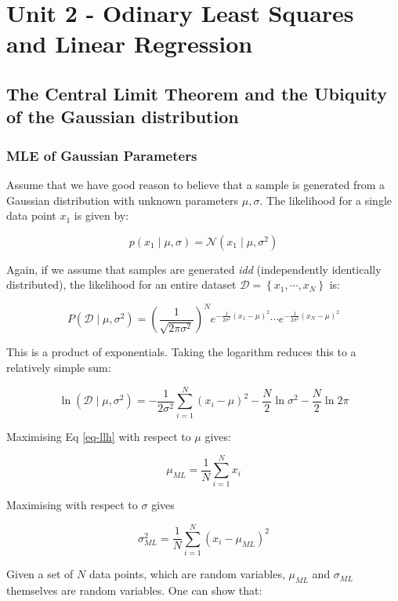 \part{Unit 2 - Odinary Least Squares and Linear Regression}

\chapter{The Central Limit Theorem and the Ubiquity of the Gaussian distribution}
\section{MLE of Gaussian Parameters}
Assume that we have good reason to believe that a sample is generated from a Gaussian distribution with unknown parameters $\mu, \sigma$.
The likelihood for a single data point $x_1$ is given by:

$$
p(x_1 \mid \mu, \sigma) = \mathcal{N}(x_1 \mid \mu, \sigma^2)
$$

Again, if we assume that samples are generated \emph{idd} (independently identically distributed), the likelihood for an entire dataset $\mathcal{D} = \left\{ x_1, \cdots, x_N \right\}$ is:

$$
P(\mathcal{D} \mid \mu, \sigma^2) = (\frac{1}{\sqrt{2 \pi \sigma^2}})^N e^{-\frac{1}{2 \sigma^2}(x_1 -\mu)^2} \cdots e^{-\frac{1}{2 \sigma^2}(x_N -\mu)^2}
$$

This is a product of exponentials. Taking the logarithm  reduces this to a relatively simple sum:

\begin{equation}
\ln (\mathcal{D} \mid \mu,\sigma^2) = -\frac{1}{2 \sigma^2}\sum^N_{i=1} (x_i - \mu)^2 - \frac{N}{2} \ln \sigma^2 - \frac{N}{2} \ln 2 \pi
\label{eq-llh}
\end{equation}

Maximising Eq \ref{eq-llh} with respect to $\mu$ gives:

\begin{equation}
\mu_{ML} = \frac{1}{N} \sum^N_{i=1} x_i
\end{equation}

Maximising with respect to $\sigma$ gives

\begin{equation}
\sigma^2_{ML} = \frac{1}{N} \sum^N_{i=1} (x_i - \mu_{ML})^2
\end{equation}


Given a set of $N$ data points, which are random variables, $\mu_{ML}$ and $\sigma_{ML}$ themselves are random variables.     One can show that:

